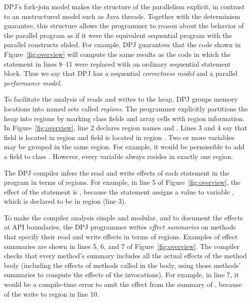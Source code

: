 DPJ's fork-join model makes the structure of the parallelism explicit,
in contrast to an unstructured model such as Java threads.  Together
with the determinism guarantee, this structure allows the programmer
to reason about the behavior of the parallel program as if it were the
equivalent sequential program with the parallel constructs elided.
For example, DPJ guarantees that the code shown in
Figure~\ref{fig:overview} will compute the same results as the code
in which the  statement in lines 8--11 were replaced with
an ordinary sequential statement block.  Thus we say that DPJ has a
sequential \emph{correctness model} and a parallel \emph{performance
  model}.

 To facilitate the analysis of reads and writes to
the heap, DPJ groups memory locations into named sets called
\emph{regions}.  The programmer explicitly partitions the heap into
regions by marking class fields and array cells with region
information.  In Figure~\ref{fig:overview}, line 2 declares region
names  and .  Lines 3 and 4 say that field  is
located in region  and field  is located in region
.  Two or more variables may be grouped in the same region.
For example, it would be permissible to add a field  to class .  However, every variable always resides in
exactly one region.

 The DPJ compiler infers the read and write effects
of each statement in the program in terms of regions.  For example, in
line 5 of Figure~\ref{fig:overview}, the effect of the statement
 is , because the statement assigns a
value to variable , which is declared to be in region 
(line 3).

To make the compiler analysis simple and modular, and to document the
effects at API boundaries, the DPJ programmer writes \emph{effect
  summaries} on methods that specify their read and write effects in
terms of regions.  Examples of effect summaries are shown in lines 5,
6, and 7 of Figure~\ref{fig:overview}.  The compiler checks that every
method's summary includes all the actual effects of the method body
(including the effects of methods called in the body, using those
methods' summaries to compute the effects of the invocations).  For
example, in line 7, it would be a compile-time error to omit the
effect  from the summary of , because of the
write to region  in line 10.  

